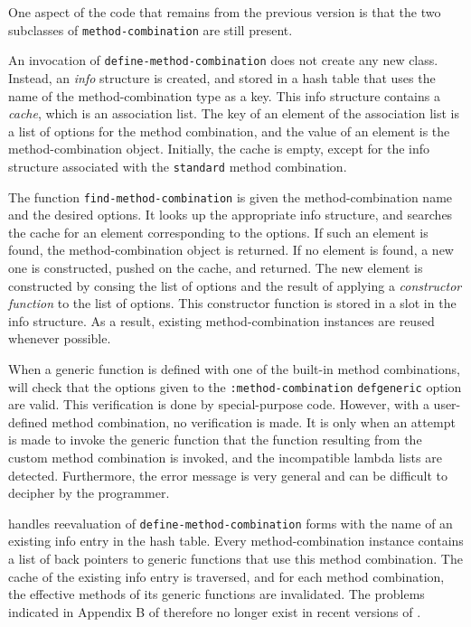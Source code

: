 One aspect of the \sbcl{} code that remains from the previous version
is that the two subclasses of \texttt{method-combination} are still
present.

An invocation of \texttt{define-method-combination} does not create
any new class.  Instead, an \emph{info} structure is created, and
stored in a hash table that uses the name of the method-combination
type as a key.  This info structure contains a \emph{cache}, which is
an association list.  The key of an element of the association list is
a list of options for the method combination, and the value of an
element is the method-combination object.  Initially, the cache is
empty, except for the info structure associated with the
\texttt{standard} method combination.

The function \texttt{find-method-combination} is given the
method-combination name and the desired options.  It looks up the
appropriate info structure, and searches the cache for an element
corresponding to the options.  If such an element is found, the
method-combination object is returned.  If no element is found, a new
one is constructed, pushed on the cache, and returned.  The new
element is constructed by consing the list of options and the result
of applying a \emph{constructor function} to the list of options.
This constructor function is stored in a slot in the info structure.
As a result, existing method-combination instances are reused whenever
possible.

When a generic function is defined with one of the built-in method
combinations, \sbcl{} will check that the options given to the
\texttt{:method-combination} \texttt{defgeneric} option are valid.
This verification is done by special-purpose code.  However, with a
user-defined method combination, no verification is made.  It is only
when an attempt is made to invoke the generic function that the
function resulting from the custom method combination is invoked, and
the incompatible lambda lists are detected.  Furthermore, the error
message is very general and can be difficult to decipher by the
programmer.

\sbcl{} handles reevaluation of \texttt{define-method-combination}
forms with the name of an existing info entry in the hash table.
Every method-combination instance contains a list of back pointers to
generic functions that use this method combination.  The cache of the
existing info entry is traversed, and for each method combination, the
effective methods of its generic functions are invalidated.
The problems indicated in Appendix B of \cite{verna.18.els} therefore
no longer exist in recent versions of \sbcl{}.

